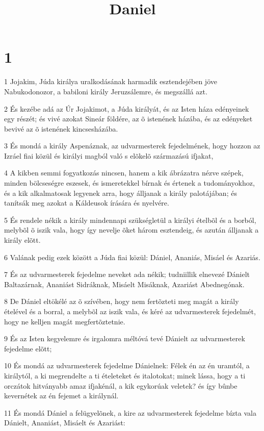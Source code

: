 

\title{Daniel}


\chapter{1}

\par 1 Jojakim, Júda királya uralkodásának harmadik esztendejében jöve Nabukodonozor, a babiloni király Jeruzsálemre, és megszállá azt.
\par 2 És kezébe adá az Úr Jojakimot, a Júda királyát, és az Isten háza edényeinek egy részét; és vivé azokat Sineár földére, az õ istenének házába, és az edényeket bevivé az õ istenének kincsesházába.
\par 3 És mondá a király Aspenáznak, az udvarmesterek fejedelmének, hogy hozzon az Izráel fiai közül és királyi magból való s elõkelõ származású ifjakat,
\par 4 A kikben semmi fogyatkozás nincsen, hanem a kik ábrázatra nézve szépek, minden bölcseségre eszesek, és ismeretekkel bírnak és értenek a tudományokhoz, és a kik alkalmatosak legyenek arra, hogy álljanak a király palotájában; és tanítsák meg azokat a Káldeusok írására és nyelvére.
\par 5 És rendele nékik a király mindennapi szükségletül a királyi ételbõl és a borból, melybõl õ iszik vala, hogy így nevelje õket három esztendeig, és azután álljanak a király elõtt.
\par 6 Valának pedig ezek között a Júda fiai közül: Dániel, Ananiás, Misáel és Azariás.
\par 7 És az udvarmesterek fejedelme neveket ada nékik; tudniillik elnevezé Dánielt Baltazárnak, Ananiást Sidráknak, Misáelt Misáknak, Azariást Abednegónak.
\par 8 De Dániel eltökélé az õ szívében, hogy nem fertõzteti meg magát a király ételével és a borral, a melybõl az iszik vala, és kéré az udvarmesterek fejedelmét, hogy ne kelljen magát megfertõztetnie.
\par 9 És az Isten kegyelemre és irgalomra méltóvá tevé Dánielt az udvarmesterek fejedelme elõtt;
\par 10 És mondá az udvarmesterek fejedelme Dánielnek: Félek én az én uramtól, a királytól, a ki megrendelte a ti ételeteket és italotokat; minek lássa, hogy a ti orczátok hitványabb amaz ifjakénál, a kik egykorúak veletek? és így bûnbe kevernétek az én fejemet a királynál.
\par 11 És mondá Dániel a felügyelõnek, a kire az udvarmesterek fejedelme bízta vala Dánielt, Ananiást, Misáelt és Azariást:
